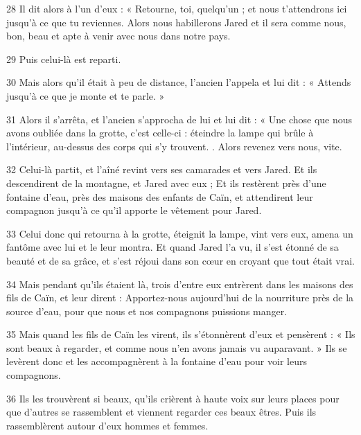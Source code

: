 \par 28 Il dit alors à l'un d'eux : « Retourne, toi, quelqu'un ; et nous t'attendrons ici jusqu'à ce que tu reviennes. Alors nous habillerons Jared et il sera comme nous, bon, beau et apte à venir avec nous dans notre pays.

\par 29 Puis celui-là est reparti.

\par 30 Mais alors qu'il était à peu de distance, l'ancien l'appela et lui dit : « Attends jusqu'à ce que je monte et te parle. »

\par 31 Alors il s'arrêta, et l'ancien s'approcha de lui et lui dit : « Une chose que nous avons oubliée dans la grotte, c'est celle-ci : éteindre la lampe qui brûle à l'intérieur, au-dessus des corps qui s'y trouvent. . Alors revenez vers nous, vite.

\par 32 Celui-là partit, et l'aîné revint vers ses camarades et vers Jared. Et ils descendirent de la montagne, et Jared avec eux ; Et ils restèrent près d'une fontaine d'eau, près des maisons des enfants de Caïn, et attendirent leur compagnon jusqu'à ce qu'il apporte le vêtement pour Jared.

\par 33 Celui donc qui retourna à la grotte, éteignit la lampe, vint vers eux, amena un fantôme avec lui et le leur montra. Et quand Jared l'a vu, il s'est étonné de sa beauté et de sa grâce, et s'est réjoui dans son cœur en croyant que tout était vrai.

\par 34 Mais pendant qu'ils étaient là, trois d'entre eux entrèrent dans les maisons des fils de Caïn, et leur dirent : Apportez-nous aujourd'hui de la nourriture près de la source d'eau, pour que nous et nos compagnons puissions manger.

\par 35 Mais quand les fils de Caïn les virent, ils s'étonnèrent d'eux et pensèrent : « Ils sont beaux à regarder, et comme nous n'en avons jamais vu auparavant. » Ils se levèrent donc et les accompagnèrent à la fontaine d'eau pour voir leurs compagnons.

\par 36 Ils les trouvèrent si beaux, qu'ils crièrent à haute voix sur leurs places pour que d'autres se rassemblent et viennent regarder ces beaux êtres. Puis ils rassemblèrent autour d’eux hommes et femmes.

